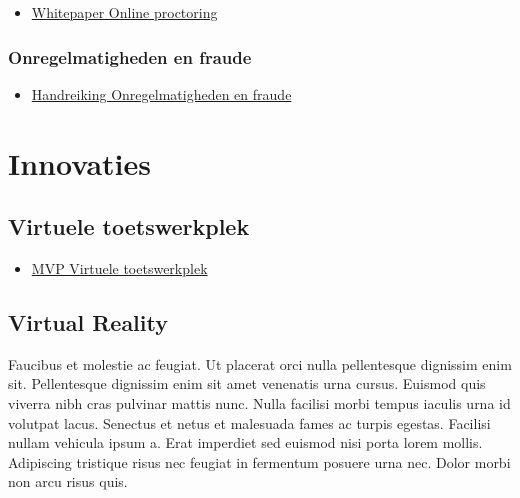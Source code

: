 \documentclass[
  letterpaper,
  DIV=11,
  numbers=noendperiod]{scrreprt}
\providecommand{\tightlist}{%
  \setlength{\itemsep}{0pt}\setlength{\parskip}{0pt}}\usepackage{longtable,booktabs,array}
\begin{document}
\begin{itemize}
\tightlist
\item
  \href{https://www.surf.nl/whitepaper-online-proctoring-surveilleren-op-afstand}{Whitepaper
  Online proctoring}
\end{itemize}

\hypertarget{onregelmatigheden-en-fraude}{%
\subsection{Onregelmatigheden en
fraude}\label{onregelmatigheden-en-fraude}}

\begin{itemize}
\tightlist
\item
  \href{https://werkgroep-toetsen-op-afstand.github.io/Resultaten-Enquete-Examencommissies/handreikingen.html\#het-onderscheid-tussen-onregelmatigheid-en-fraude-handreiking-voor-examencommissies}{Handreiking
  Onregelmatigheden en fraude}
\end{itemize}


\hypertarget{innovaties}{%
\chapter{Innovaties}\label{innovaties}}

\hypertarget{virtuele-toetswerkplek}{%
\section{Virtuele toetswerkplek}\label{virtuele-toetswerkplek}}

\begin{itemize}
\tightlist
\item
  \href{https://www.surf.nl/virtuele-toetswerkplek}{MVP Virtuele
  toetswerkplek}
\end{itemize}

\hypertarget{virtual-reality}{%
\section{Virtual Reality}\label{virtual-reality}}

Faucibus et molestie ac feugiat. Ut placerat orci nulla pellentesque
dignissim enim sit. Pellentesque dignissim enim sit amet venenatis urna
cursus. Euismod quis viverra nibh cras pulvinar mattis nunc. Nulla
facilisi morbi tempus iaculis urna id volutpat lacus. Senectus et netus
et malesuada fames ac turpis egestas. Facilisi nullam vehicula ipsum a.
Erat imperdiet sed euismod nisi porta lorem mollis. Adipiscing tristique
risus nec feugiat in fermentum posuere urna nec. Dolor morbi non arcu
risus quis.
\end{document}
